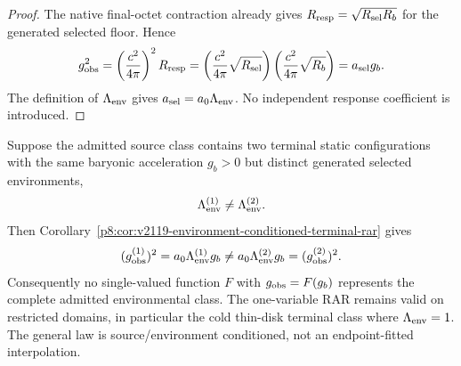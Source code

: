 \documentclass[12pt,a4paper]{article}
\begin{document}
\begin{proof}
The native final-octet contraction already gives
$R_{\rm resp}=\sqrt{R_{\rm sel}R_b}$ for the generated selected floor.  Hence
\[
 g_{\rm obs}^2
 =\left(\frac{c^2}{4\pi}\right)^2R_{\rm resp}
 =\left(\frac{c^2}{4\pi}\sqrt{R_{\rm sel}}\right)
  \left(\frac{c^2}{4\pi}\sqrt{R_b}\right)
 =a_{\rm sel}g_b.
\]
The definition of $\Lambda_{\rm env}$ gives
$a_{\rm sel}=a_0\Lambda_{\rm env}$.  No independent response coefficient is
introduced.
\end{proof}

\begin{corollary}
\label{p8:cor:v2119-no-global-one-variable-rar}
Suppose the admitted source class contains two terminal static configurations
with the same baryonic acceleration $g_b>0$ but distinct generated selected
environments,
\[
 \Lambda_{\rm env}^{(1)}\ne\Lambda_{\rm env}^{(2)}.
\]
Then Corollary~\ref{p8:cor:v2119-environment-conditioned-terminal-rar}
gives
\[
 (g_{\rm obs}^{(1)})^2
 =a_0\Lambda_{\rm env}^{(1)}g_b
 \ne
 a_0\Lambda_{\rm env}^{(2)}g_b
 =(g_{\rm obs}^{(2)})^2.
\]
Consequently no single-valued function $F$ with
$g_{\rm obs}=F(g_b)$ represents the complete admitted environmental class.
The one-variable RAR remains valid on restricted domains, in particular the
cold thin-disk terminal class where $\Lambda_{\rm env}=1$.  The general law is
source/environment conditioned, not an endpoint-fitted interpolation.
\end{corollary}
\end{document}
